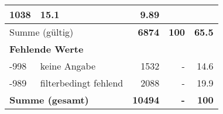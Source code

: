 \begin{longtable}{lXrrr}
       \num{1038} &
       \num[round-mode=places,round-precision=2]{15,1} &
         \num[round-mode=places,round-precision=2]{9,89} \\
     \midrule
     \multicolumn{2}{l}{Summe (gültig)} &
       \textbf{\num{6874}} &
     \textbf{100} &
       \textbf{\num[round-mode=places,round-precision=2]{65,5}} \\
     \multicolumn{5}{l}{\textbf{Fehlende Werte}}\\
       -998 &
       keine Angabe &
         \num{1532} &
        - &
         \num[round-mode=places,round-precision=2]{14,6} \\
       -989 &
       filterbedingt fehlend &
         \num{2088} &
        - &
         \num[round-mode=places,round-precision=2]{19,9} \\
     \midrule
     \multicolumn{2}{l}{\textbf{Summe (gesamt)}} &
          \textbf{\num{10494}} &
        \textbf{-} &
        \textbf{100} \\
     \bottomrule
     \end{longtable}
     
